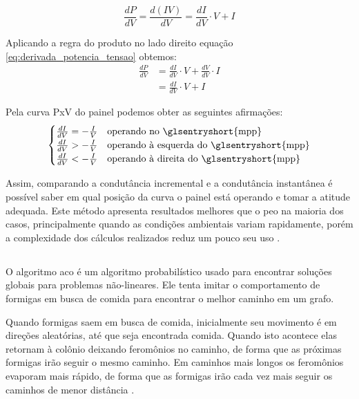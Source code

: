 \begin{equation} \label{eq:derivada_potencia_tensao}
\frac{dP}{dV} = \frac{d(IV)}{dV}
= \frac{dI}{dV}\cdot V + I
\end{equation}

Aplicando a regra do produto no lado direito equação \ref{eq:derivada_potencia_tensao} obtemos:
\begin{equation}
\begin{aligned}
\frac{dP}{dV} &= \frac{dI}{dV}\cdot V + \frac{dV}{dV}\cdot I \\
&= \frac{dI}{dV}\cdot V + I
\end{aligned}
\end{equation}

Pela curva PxV do painel podemos obter as seguintes afirmações:
\begin{gather*}
\begin{cases}
\frac{dI}{dV} = -\frac{I}{V} & \text{operando no \glsentryshort{mpp}} \\
\frac{dI}{dV} > -\frac{I}{V} & \text{operando à esquerda do \glsentryshort{mpp}} \\
\frac{dI}{dV} < -\frac{I}{V} & \text{operando à direita do \glsentryshort{mpp}}
\end{cases}
\end{gather*}

Assim, comparando a condutância incremental e a condutância instantânea é possível saber em qual posição da curva o painel está operando e tomar a atitude adequada. Este método apresenta resultados melhores que o \gls{peo} na maioria dos casos, principalmente quando as condições ambientais variam rapidamente, porém a complexidade dos cálculos realizados reduz um pouco seu uso \cite{tofoli2015}.

\subsection{}

O algoritmo \gls{aco} é um algoritmo probabilístico usado para encontrar soluções globais para problemas não-lineares. Ele tenta imitar o comportamento de formigas em busca de comida para encontrar o melhor caminho em um grafo.

Quando formigas saem em busca de comida, inicialmente seu movimento é em direções aleatórias, até que seja encontrada comida. Quando isto acontece elas retornam à colônio deixando feromônios no caminho, de forma que as próximas formigas irão seguir o mesmo caminho. Em caminhos mais longos os feromônios evaporam mais rápido, de forma que as formigas irão cada vez mais seguir os caminhos de menor distância \cite{dorigo2006}.


